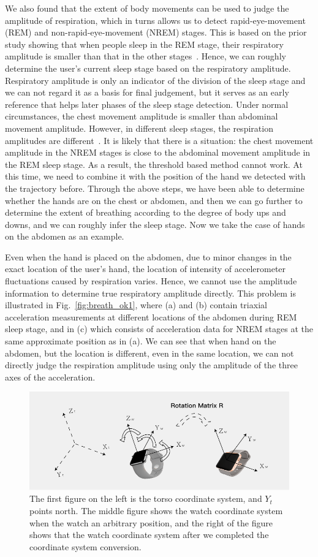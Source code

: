 We also found that the extent of body movements can be used to judge the amplitude of respiration, which in turns allows us to detect
rapid-eye-movement (REM) and non-rapid-eye-movement (NREM) stages. This is based on the prior study showing that when people sleep in the
REM stage, their respiratory amplitude is smaller than that in the other stages~\cite{respiratory1982}. Hence, we can roughly determine the
user's current sleep stage based on the respiratory amplitude. Respiratory amplitude is only an indicator of the division of the sleep
stage and we can not regard it as a basis for final judgement, but it serves as an early reference that helps later phases of the sleep
stage detection. Under normal circumstances, the chest movement amplitude is smaller than abdominal movement amplitude. However, in
different sleep stages, the respiration amplitudes are different~\cite{respiratory}. It is likely that there is a situation: the chest
movement amplitude in the NREM stages is close to the abdominal movement amplitude in the REM sleep stage. As a result, the threshold based
method cannot work. At this time, we need to combine it with the position of the hand we detected with the trajectory before. Through the
above steps, we have been able to determine whether the hands are on the chest or abdomen, and then we can go further to determine the
extent of breathing according to the degree of body ups and downs, and we can roughly infer the sleep stage. Now we take the case of hands
on the abdomen as an example.



Even when the hand is placed on the abdomen, due to minor changes in the exact location of the user's hand, the location of intensity of
accelerometer fluctuations caused by respiration varies. Hence, we cannot use the amplitude information to determine true respiratory
amplitude directly. This problem is illustrated in Fig.~\ref{fig:breath_ok1}, where (a) and (b) contain triaxial acceleration measurements
at different locations of the abdomen during REM sleep stage, and in (c) which consists of acceleration data for NREM stages at the same
approximate position as in (a). We can see that when hand on the abdomen, but the location is different, even in the same location, we can
not directly judge the respiration amplitude using only the amplitude of the three axes of the acceleration.

\begin{figure}[!t]
\centering
      \includegraphics[width=0.67\linewidth]{Figures/watch.pdf}
  \caption{The first figure on the left is the torso coordinate system, and $Y_t$ points north. The middle figure shows the watch coordinate system when the watch an arbitrary position, and the right of the figure shows that the  watch coordinate system after we completed the coordinate system conversion.}\label{fig:watch}
\end{figure}

